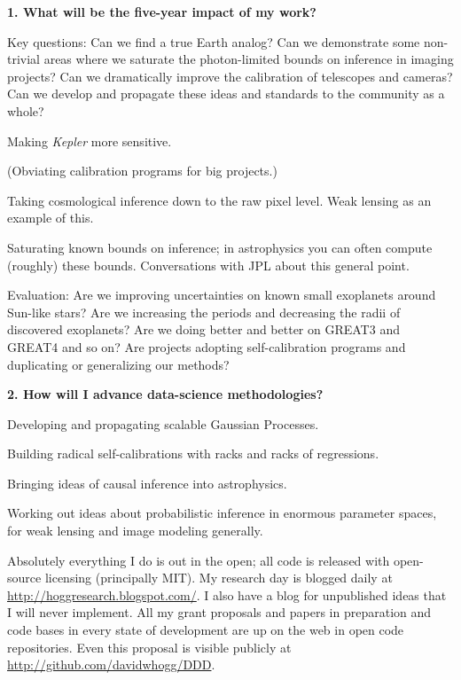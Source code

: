 \documentclass[11pt, letterpaper]{article}
\begin{document}
\sloppy\sloppypar

\noindent\textbf{1. What will be the five-year impact of my work?}
\smallskip

Key questions: Can we find a true Earth analog?  Can we demonstrate
some non-trivial areas where we saturate the photon-limited bounds on
inference in imaging projects?  Can we dramatically improve the
calibration of telescopes and cameras?  Can we develop and propagate
these ideas and standards to the community as a whole?

Making \textsl{Kepler} more sensitive.

(Obviating calibration programs for big projects.)

Taking cosmological inference down to the raw pixel level.  Weak
lensing as an example of this.

Saturating known bounds on inference; in astrophysics you can often
compute (roughly) these bounds.  Conversations with JPL about this
general point.

Evaluation: Are we improving uncertainties on known small exoplanets
around Sun-like stars?  Are we increasing the periods and decreasing
the radii of discovered exoplanets?  Are we doing better and better on
GREAT3 and GREAT4 and so on?  Are projects adopting self-calibration
programs and duplicating or generalizing our methods?

\bigskip
\noindent\textbf{2. How will I advance data-science methodologies?}
\smallskip

Developing and propagating scalable Gaussian Processes.

Building radical self-calibrations with racks and racks of regressions.

Bringing ideas of causal inference into astrophysics.

Working out ideas about probabilistic inference in enormous parameter spaces,
for weak lensing and image modeling generally.

Absolutely everything I do is out in the open; all code is released
with open-source licensing (principally MIT).  My research day is
blogged daily at \url{http://hoggresearch.blogspot.com/}.  I also have
a blog for unpublished ideas that I will never implement.  All my
grant proposals and papers in preparation and code bases in every
state of development are up on the web in open code repositories.
Even this proposal is visible publicly at
\url{http://github.com/davidwhogg/DDD}.
\end{document}
